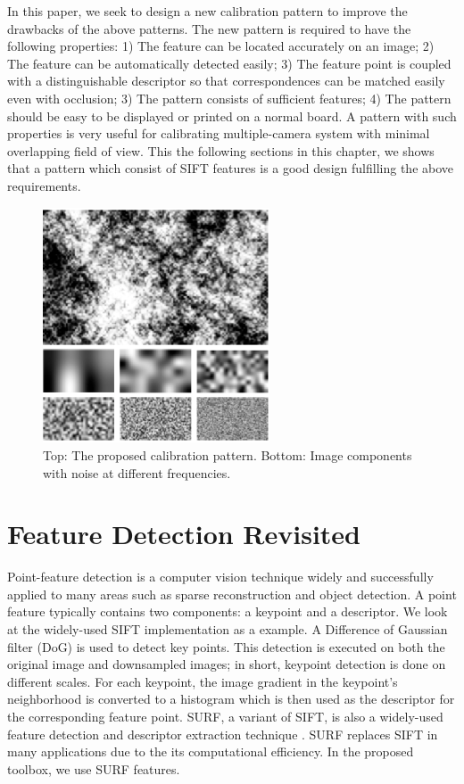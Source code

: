 \documentclass{report}
\begin{document}
In this paper, we seek to design a new calibration pattern to improve the drawbacks of the above patterns. The new pattern is required to have the following properties: 1) The feature can be located accurately on an image; 2) The feature can be automatically detected easily; 3) The feature point is coupled with a distinguishable descriptor so that correspondences can be matched easily even with occlusion; 3) The pattern consists of sufficient features; 4) The pattern should be easy to be displayed or printed on a normal board. A pattern with such properties is very useful for calibrating multiple-camera system with minimal overlapping field of view. This the following sections in this chapter, we shows that a pattern which consist of SIFT features \cite{lowe2004distinctive} is a good design fulfilling the above requirements. 


\begin{figure}
\centering
\includegraphics[width=0.6\textwidth]{images/patternsample}
\caption{Top: The proposed calibration pattern. Bottom: Image components with noise at different frequencies.}
\label{PatternFig}
\end{figure}


\label{PatternSec}
\section{Feature Detection Revisited}

Point-feature detection is a computer vision technique widely and successfully applied to many areas such as sparse reconstruction and object detection. A point feature typically contains two components: a keypoint and a descriptor. We look at the widely-used SIFT implementation \cite{lowe2004distinctive} as a example. A Difference of Gaussian filter (DoG) is used to detect key points. This detection is executed on both the original image and downsampled images; in short, keypoint detection is done on different scales. For each keypoint, the image gradient in the keypoint's neighborhood is converted to a histogram which is then used as the descriptor for the corresponding feature point. SURF, a variant of SIFT, is also a widely-used feature detection and descriptor extraction technique \cite{bay2006surf}. SURF replaces SIFT in many applications due to the its computational efficiency. In the proposed toolbox, we use SURF features. 
\end{document}
